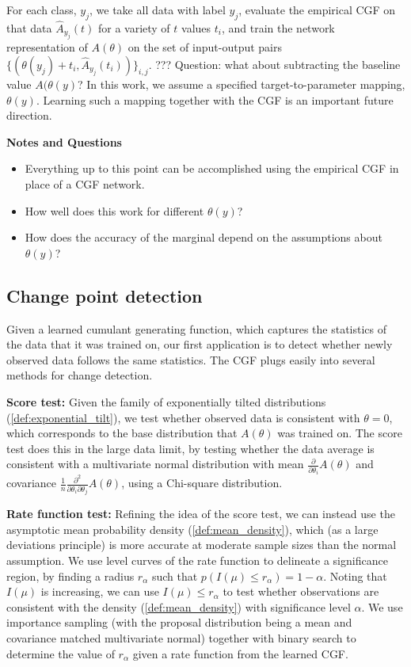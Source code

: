 \documentclass[11pt]{article}      %
\begin{document}
For each class, $y_j$, we take all data with label $y_j$, evaluate the empirical CGF on that data $\hat A_{y_j}(t)$ for a variety of $t$ values $t_i$, and train the network representation of $A(\theta)$ on the set of input-output pairs $\{(\theta(y_j) + t_i, \hat A_{y_j}(t_i))\}_{i,j}$.
??? Question: what about subtracting the baseline value $A(\theta(y)$?
In this work, we assume a specified target-to-parameter mapping, $\theta(y)$.
Learning such a mapping together with the CGF is an important future direction.


\noindent \textbf{Notes and Questions}
\begin{itemize}
  \item Everything up to this point can be accomplished using the empirical CGF in place of a CGF network.
  \item How well does this work for different $\theta(y)$?
  \item How does the accuracy of the marginal depend on the assumptions about $\theta(y)$?
\end{itemize}






\newpage
\subsection{Change point detection}
Given a learned cumulant generating function, which captures the statistics of the data that it was trained on, our first application is to detect whether newly observed data follows the same statistics.
The CGF plugs easily into several methods for change detection.

\noindent \textbf{Score test:} \cite{cox1979theoretical} 
Given the family of exponentially tilted distributions (\ref{def:exponential_tilt}), we test whether observed data is consistent with $\theta = 0$, which corresponds to the base distribution that $A(\theta)$ was trained on.
The score test does this in the large data limit, by testing whether the data average is consistent with a multivariate normal distribution with mean $\frac{\partial}{\partial \theta_i} A(\theta)$ and covariance $\frac{1}{n}\frac{\partial^2}{\partial \theta_i \partial \theta_j} A(\theta)$, using a Chi-square distribution.

\noindent \textbf{Rate function test:} Refining the idea of the score test, we can instead use the asymptotic mean probability density (\ref{def:mean_density}), which (as a large deviations principle) is more accurate at moderate sample sizes than the normal assumption.
We use level curves of the rate function to delineate a significance region, by finding a radius $r_\alpha$ such that $p(I(\mu) \le r_\alpha) = 1 - \alpha$.
Noting that $I(\mu)$ is increasing, we can use $I(\mu) \le r_\alpha$ to test whether observations are consistent with the density (\ref{def:mean_density}) with significance level $\alpha$.
We use importance sampling (with the proposal distribution being a mean and covariance matched multivariate normal) together with binary search to determine the value of $r_\alpha$ given a rate function from the learned CGF.
\end{document}
